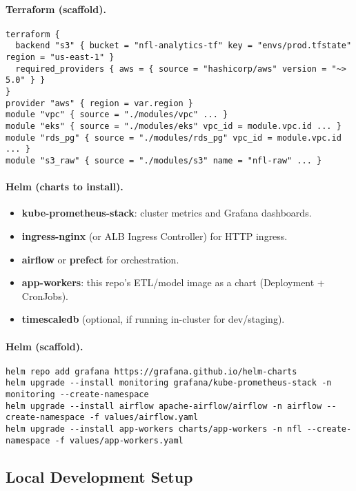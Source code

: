 \paragraph{Terraform (scaffold).}
\begin{verbatim}
terraform {
  backend "s3" { bucket = "nfl-analytics-tf" key = "envs/prod.tfstate" region = "us-east-1" }
  required_providers { aws = { source = "hashicorp/aws" version = "~> 5.0" } }
}
provider "aws" { region = var.region }
module "vpc" { source = "./modules/vpc" ... }
module "eks" { source = "./modules/eks" vpc_id = module.vpc.id ... }
module "rds_pg" { source = "./modules/rds_pg" vpc_id = module.vpc.id ... }
module "s3_raw" { source = "./modules/s3" name = "nfl-raw" ... }
\end{verbatim}

\paragraph{Helm (charts to install).}
\begin{itemize}
  \item \textbf{kube-prometheus-stack}: cluster metrics and Grafana dashboards.
  \item \textbf{ingress-nginx} (or ALB Ingress Controller) for HTTP ingress.
  \item \textbf{airflow} or \textbf{prefect} for orchestration.
  \item \textbf{app-workers}: this repo's ETL/model image as a chart (Deployment + CronJobs).
  \item \textbf{timescaledb} (optional, if running in-cluster for dev/staging).
\end{itemize}
\paragraph{Helm (scaffold).}
\begin{verbatim}
helm repo add grafana https://grafana.github.io/helm-charts
helm upgrade --install monitoring grafana/kube-prometheus-stack -n monitoring --create-namespace
helm upgrade --install airflow apache-airflow/airflow -n airflow --create-namespace -f values/airflow.yaml
helm upgrade --install app-workers charts/app-workers -n nfl --create-namespace -f values/app-workers.yaml
\end{verbatim}

\subsection{Local Development Setup}
